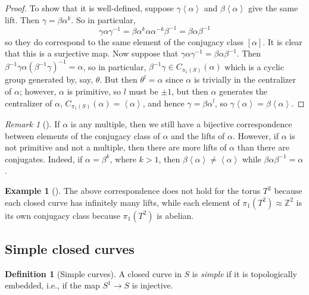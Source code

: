 \documentclass[reqno]{amsart}
\theoremstyle{definition}
\newtheorem{definition}[theorem]{Definition}
\newtheorem{example}[theorem]{Example}
\theoremstyle{remark}
\newtheorem*{remark}{Remark}
\begin{document}
 \begin{proof}
To show that it is well-defined, suppose $\gamma \left<\alpha \right>$ and
$\beta \left<\alpha \right>$ give the same lift. Then
$\gamma = \beta \alpha^k$. So in particular,
\[
    \gamma \alpha \gamma^{-1} = \beta \alpha^k \alpha \alpha^{-k} \beta^{-1}
    = \beta \alpha \beta^{-1}
\] 
so they do correspond to the same element of the conjugacy class
$\left[ \alpha \right] $. It is clear that this is a surjective map.
Now suppose that $\gamma \alpha \gamma^{-1} = \beta \alpha \beta^{-1}$. 
Then $\beta^{-1} \gamma \alpha \left( \beta^{-1} \gamma \right)^{-1} =
\alpha$, so in particular, $\beta^{-1} \gamma \in C_{\pi_1(S)}(\alpha)$
which is a cyclic group generated by, say, $\theta$. But then
$\theta^l = \alpha$ since $\alpha$ is trivially in the centralizer of
$\alpha$; however, $\alpha$ is primitive, so
$l$ must be $\pm 1$, but then  $\alpha$ generates the centralizer of
$\alpha$, $C_{\pi_1 (S)}(\alpha) = \left<\alpha \right>$, and hence
$\gamma = \beta \alpha^l$, so $\gamma \left<\alpha \right>
= \beta \left<\alpha \right>$.
 \end{proof}

 \begin{remark}[]
     If $\alpha$ is any multiple, then we still have a bijective correspondence
     between elements of the conjugacy class of $\alpha$ and the
     lifts of $\alpha$. However, if $\alpha$ is not primitive and not
     a multiple, then there are more lifts of $\alpha$ than there
     are conjugates. Indeed, if $\alpha = \beta^{k}$, where $k > 1$, then
     $\beta \left<\alpha \right> \neq \left<\alpha \right>$ while
     $\beta \alpha \beta^{-1} = \alpha$.
 \end{remark}

 \begin{example}[]
     The above correspondence does not hold for the torus $T^2$ because
     each closed curve has infinitely many lifts, while
     each element of $\pi_1 \left( T^2 \right) \approx \mathbb{Z}^2$ 
     is its own conjugacy class because $\pi_1 \left( T^2 \right) $ is
     abelian. 
 \end{example}


 \subsection{Simple closed curves}
 
\begin{definition}[Simple curves]
    A closed curve in $S$ is \textit{simple} if it is topologically embedded, i.e.,
    if the map $S^{1} \to S$ is injective.  
\end{definition}
\end{document}

